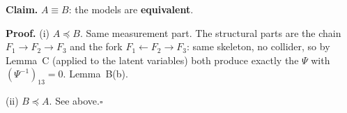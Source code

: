\documentclass[10pt,a4paper]{article}
\newcommand{\nest}{\preceq}
\begin{document}
\par\bigskip
\noindent\textbf{Claim.} $A \equiv B$: the models are \textbf{equivalent}.\par\smallskip
\noindent\textbf{Proof.} (i) $A\nest B$. Same measurement part. The structural parts are the chain $F_1\to F_2\to F_3$ and the fork $F_1\leftarrow F_2\to F_3$: same skeleton, no collider, so by Lemma~C (applied to the latent variables) both produce exactly the $\Psi$ with $(\Psi^{-1})_{13}=0$. Lemma~B(b).\par\smallskip
\noindent(ii) $B\nest A$. See above.\hfill$\square$\par\medskip
{}

\clearpage
\end{document}
